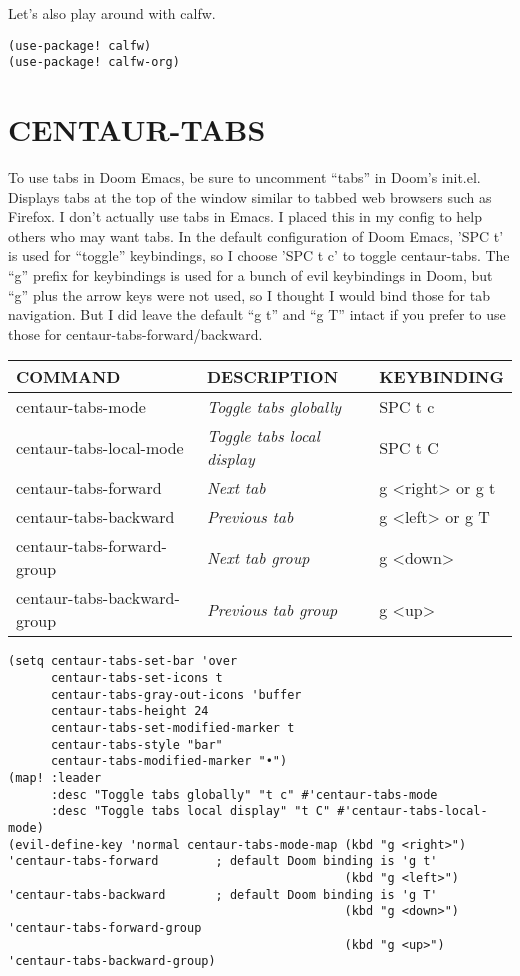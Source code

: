 \documentclass[11pt]{article}
\begin{document}
Let's also play around with calfw.
\begin{verbatim}
(use-package! calfw)
(use-package! calfw-org)
\end{verbatim}

\section{CENTAUR-TABS}
\label{sec:orgb8c06a1}
To use tabs in Doom Emacs, be sure to uncomment ``tabs'' in Doom's init.el.  Displays tabs at the top of the window similar to tabbed web browsers such as Firefox.  I don't actually use tabs in Emacs.  I placed this in my config to help others who may want tabs.  In the default configuration of Doom Emacs, 'SPC t' is used for ``toggle'' keybindings, so I choose 'SPC t c' to toggle centaur-tabs.  The ``g'' prefix for keybindings is used for a bunch of evil keybindings in Doom, but ``g'' plus the arrow keys were not used, so I thought I would bind those for tab navigation.  But I did leave the default ``g t'' and ``g T'' intact if you prefer to use those for centaur-tabs-forward/backward.

\begin{center}
\begin{tabular}{lll}
COMMAND & DESCRIPTION & KEYBINDING\\[0pt]
\hline
centaur-tabs-mode & \emph{Toggle tabs globally} & SPC t c\\[0pt]
centaur-tabs-local-mode & \emph{Toggle tabs local display} & SPC t C\\[0pt]
centaur-tabs-forward & \emph{Next tab} & g <right> or g t\\[0pt]
centaur-tabs-backward & \emph{Previous tab} & g <left> or g T\\[0pt]
centaur-tabs-forward-group & \emph{Next tab group} & g <down>\\[0pt]
centaur-tabs-backward-group & \emph{Previous tab group} & g <up>\\[0pt]
\end{tabular}
\end{center}

\begin{verbatim}
(setq centaur-tabs-set-bar 'over
      centaur-tabs-set-icons t
      centaur-tabs-gray-out-icons 'buffer
      centaur-tabs-height 24
      centaur-tabs-set-modified-marker t
      centaur-tabs-style "bar"
      centaur-tabs-modified-marker "•")
(map! :leader
      :desc "Toggle tabs globally" "t c" #'centaur-tabs-mode
      :desc "Toggle tabs local display" "t C" #'centaur-tabs-local-mode)
(evil-define-key 'normal centaur-tabs-mode-map (kbd "g <right>") 'centaur-tabs-forward        ; default Doom binding is 'g t'
                                               (kbd "g <left>")  'centaur-tabs-backward       ; default Doom binding is 'g T'
                                               (kbd "g <down>")  'centaur-tabs-forward-group
                                               (kbd "g <up>")    'centaur-tabs-backward-group)
\end{verbatim}
\end{document}
